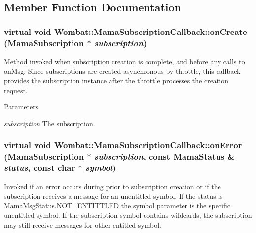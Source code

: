 \subsection{Member Function Documentation}
\hypertarget{classWombat_1_1MamaSubscriptionCallback_a9cdbf8347dcb5110a5f9755c83276fd4}{
\subsubsection[{onCreate}]{\setlength{\rightskip}{0pt plus 5cm}virtual void Wombat::MamaSubscriptionCallback::onCreate ({\bf MamaSubscription} $\ast$ {\em subscription})}}
\label{classWombat_1_1MamaSubscriptionCallback_a9cdbf8347dcb5110a5f9755c83276fd4}


Method invoked when subscription creation is complete, and before any calls to {\ttfamily onMsg}. Since subscriptions are created asynchronous by throttle, this callback provides the subscription instance after the throttle processes the creation request.


\begin{DoxyParams}{Parameters}
\item[{\em subscription}]The subscription. \end{DoxyParams}
\hypertarget{classWombat_1_1MamaSubscriptionCallback_ab325050a90c83590c31da66114858c44}{
\subsubsection[{onError}]{\setlength{\rightskip}{0pt plus 5cm}virtual void Wombat::MamaSubscriptionCallback::onError ({\bf MamaSubscription} $\ast$ {\em subscription}, \/  const {\bf MamaStatus} \& {\em status}, \/  const char $\ast$ {\em symbol})}}
\label{classWombat_1_1MamaSubscriptionCallback_ab325050a90c83590c31da66114858c44}


Invoked if an error occurs during prior to subscription creation or if the subscription receives a message for an unentitled symbol. If the status is {\ttfamily MamaMsgStatus.NOT\_\-ENTITTLED} the symbol parameter is the specific unentitled symbol. If the subscription symbol contains wildcards, the subscription may still receive messages for other entitled symbol.


